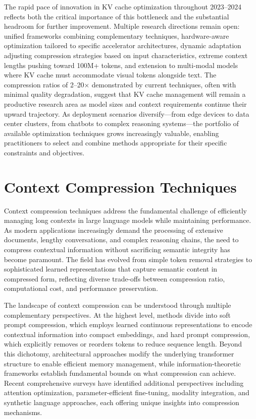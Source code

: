 The rapid pace of innovation in KV cache optimization throughout 2023--2024 reflects both the critical importance of this bottleneck and the substantial headroom for further improvement. Multiple research directions remain open: unified frameworks combining complementary techniques, hardware-aware optimization tailored to specific accelerator architectures, dynamic adaptation adjusting compression strategies based on input characteristics, extreme context lengths pushing toward 100M+ tokens, and extension to multi-modal models where KV cache must accommodate visual tokens alongside text. The compression ratios of 2--20$\times$ demonstrated by current techniques, often with minimal quality degradation, suggest that KV cache management will remain a productive research area as model sizes and context requirements continue their upward trajectory. As deployment scenarios diversify---from edge devices to data center clusters, from chatbots to complex reasoning systems---the portfolio of available optimization techniques grows increasingly valuable, enabling practitioners to select and combine methods appropriate for their specific constraints and objectives.
\section{Context Compression Techniques}
\label{sec:compression}

Context compression techniques address the fundamental challenge of efficiently managing long contexts in large language models while maintaining performance. As modern applications increasingly demand the processing of extensive documents, lengthy conversations, and complex reasoning chains, the need to compress contextual information without sacrificing semantic integrity has become paramount. The field has evolved from simple token removal strategies to sophisticated learned representations that capture semantic content in compressed form, reflecting diverse trade-offs between compression ratio, computational cost, and performance preservation.

The landscape of context compression can be understood through multiple complementary perspectives. At the highest level, methods divide into soft prompt compression, which employs learned continuous representations to encode contextual information into compact embeddings, and hard prompt compression, which explicitly removes or reorders tokens to reduce sequence length. Beyond this dichotomy, architectural approaches modify the underlying transformer structure to enable efficient memory management, while information-theoretic frameworks establish fundamental bounds on what compression can achieve. Recent comprehensive surveys \citep{li2025prompt} have identified additional perspectives including attention optimization, parameter-efficient fine-tuning, modality integration, and synthetic language approaches, each offering unique insights into compression mechanisms.


